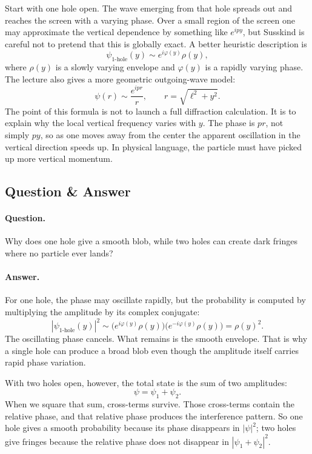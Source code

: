 Start with one hole open. The wave emerging from that hole spreads out and reaches the screen with a varying phase. Over a small region of the screen one may approximate the vertical dependence by something like \(e^{ipy}\), but Susskind is careful not to pretend that this is globally exact. A better heuristic description is
\begin{equation}
\psi_{\text{1-hole}}(y)\sim e^{i\varphi(y)}\rho(y),
\end{equation}
where \(\rho(y)\) is a slowly varying envelope and \(\varphi(y)\) is a rapidly varying phase. The lecture also gives a more geometric outgoing-wave model:
\begin{equation}
\psi(r)\sim \frac{e^{ipr}}{r},
\qquad
r=\sqrt{\ell^2+y^2}.
\end{equation}
The point of this formula is not to launch a full diffraction calculation. It is to explain why the local vertical frequency varies with \(y\). The phase is \(pr\), not simply \(py\), so as one moves away from the center the apparent oscillation in the vertical direction speeds up. In physical language, the particle must have picked up more vertical momentum.

\subsection{Question \& Answer}

\paragraph{Question.} Why does one hole give a smooth blob, while two holes can create dark fringes where no particle ever lands?

\paragraph{Answer.} For one hole, the phase may oscillate rapidly, but the probability is computed by multiplying the amplitude by its complex conjugate:
\begin{equation}
|\psi_{\text{1-hole}}(y)|^2
 \sim
 \bigl(e^{i\varphi(y)}\rho(y)\bigr)
 \bigl(e^{-i\varphi(y)}\rho(y)\bigr)
 = \rho(y)^2.
\end{equation}
The oscillating phase cancels. What remains is the smooth envelope. That is why a single hole can produce a broad blob even though the amplitude itself carries rapid phase variation.

With two holes open, however, the total state is the sum of two amplitudes:
\[
\psi=\psi_1+\psi_2.
\]
When we square that sum, cross-terms survive. Those cross-terms contain the relative phase, and that relative phase produces the interference pattern. So one hole gives a smooth probability because its phase disappears in \(|\psi|^2\); two holes give fringes because the relative phase does not disappear in \(|\psi_1+\psi_2|^2\).

